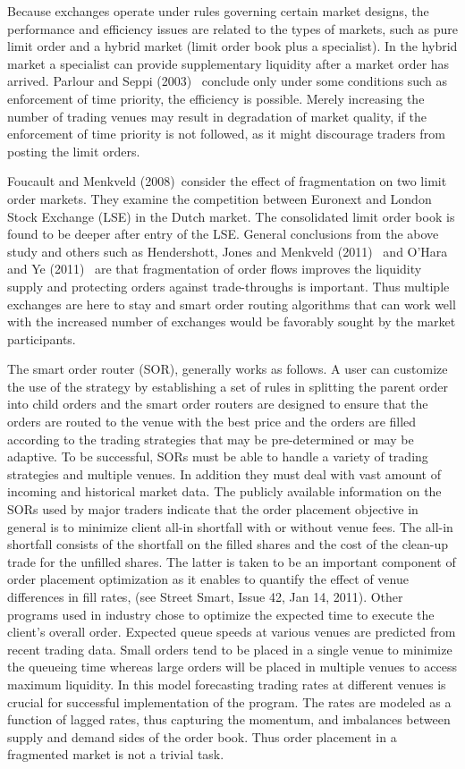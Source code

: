 Because exchanges operate under rules governing certain market designs, the performance and efficiency issues are related to the types of markets, such as pure limit order and a hybrid market (limit order book plus a specialist). In the hybrid market a specialist can provide supplementary liquidity after a market order has arrived. Parlour and Seppi (2003)~\cite{parlour2003} conclude only under some conditions such as enforcement of time priority, the efficiency is possible. Merely increasing the number of trading venues may result in degradation of market quality, if the enforcement of time priority is not followed, as it might discourage traders from posting the limit orders.


Foucault and Menkveld (2008)~\cite{foumen}consider the effect of fragmentation on two limit order markets. They examine the competition between Euronext and London Stock Exchange (LSE) in the Dutch market. The consolidated limit order book is found to be deeper after entry of the LSE. General conclusions from the above study and others such as Hendershott, Jones and Menkveld (2011)~\cite{hjm} and O'Hara and Ye (2011)~\cite{oye} are that fragmentation of order flows improves the liquidity supply and protecting orders against trade-throughs is important. Thus multiple exchanges are here to stay and smart order routing algorithms that can work well with the increased number of exchanges would be favorably sought by the market participants.


The smart order router (SOR), generally works as follows. A user can customize the use of the strategy by establishing a set of rules in splitting the parent order into child orders and the smart order routers are designed to ensure that the orders are routed to the venue with the best price and the orders are filled according to the trading strategies that may be pre-determined or may be adaptive. To be successful, SORs must be able to handle a variety of trading strategies and multiple venues. In addition they must deal with vast amount of incoming and historical market data. The publicly available information on the SORs used by major traders indicate that the order placement objective in general is to minimize client all-in shortfall with or without venue fees. The all-in shortfall consists of the shortfall on the filled shares and the cost of the clean-up trade for the unfilled shares. The latter is taken to be an important component of order placement optimization as it enables to quantify the effect of venue differences in fill rates, (see Street Smart, Issue 42, Jan 14, 2011). Other programs used in industry chose to optimize the expected time to execute the client's overall order. Expected queue speeds at various venues are predicted from recent trading data. Small orders tend to be placed in a single venue to minimize the queueing time whereas large orders will be placed in multiple venues to access maximum liquidity. In this model forecasting trading rates at different venues is crucial for successful implementation of the program. The rates are modeled as a function of lagged rates, thus capturing the momentum, and imbalances between supply and demand sides of the order book. Thus order placement in a fragmented market is not a trivial task.


